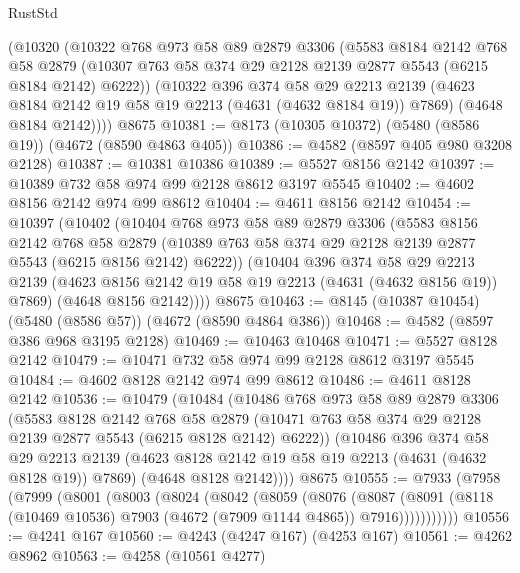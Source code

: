 \begin{lexlean}{RustStd}
\begin{coremodule}
{\begin{coremodule}
{{{{{{{{{{{{{{{{    (@10320
      (@10322
        @768
        @973
        @58
        @89
        @2879
        @3306
        (@5583
          @8184
          @2142
          @768
          @58
          @2879
          (@10307 @763 @58 @374 @29 @2128 @2139 @2877 @5543 (@6215 @8184 @2142) @6222))
        (@10322
          @396
          @374
          @58
          @29
          @2213
          @2139
          (@4623 @8184 @2142 @19 @58 @19 @2213 (@4631 (@4632 @8184 @19)) @7869)
          (@4648 @8184 @2142))))
    @8675
@10381 := @8173 (@10305 @10372) (@5480 (@8586 @19)) (@4672 (@8590 @4863 @405))
@10386 := @4582 (@8597 @405 @980 @3208 @2128)
@10387 := @10381 @10386
@10389 := @5527 @8156 @2142
@10397 := @10389 @732 @58 @974 @99 @2128 @8612 @3197 @5545
@10402 := @4602 @8156 @2142 @974 @99 @8612
@10404 := @4611 @8156 @2142
@10454 := @10397
    (@10402
      (@10404
        @768
        @973
        @58
        @89
        @2879
        @3306
        (@5583
          @8156
          @2142
          @768
          @58
          @2879
          (@10389 @763 @58 @374 @29 @2128 @2139 @2877 @5543 (@6215 @8156 @2142) @6222))
        (@10404
          @396
          @374
          @58
          @29
          @2213
          @2139
          (@4623 @8156 @2142 @19 @58 @19 @2213 (@4631 (@4632 @8156 @19)) @7869)
          (@4648 @8156 @2142))))
    @8675
@10463 := @8145 (@10387 @10454) (@5480 (@8586 @57)) (@4672 (@8590 @4864 @386))
@10468 := @4582 (@8597 @386 @968 @3195 @2128)
@10469 := @10463 @10468
@10471 := @5527 @8128 @2142
@10479 := @10471 @732 @58 @974 @99 @2128 @8612 @3197 @5545
@10484 := @4602 @8128 @2142 @974 @99 @8612
@10486 := @4611 @8128 @2142
@10536 := @10479
    (@10484
      (@10486
        @768
        @973
        @58
        @89
        @2879
        @3306
        (@5583
          @8128
          @2142
          @768
          @58
          @2879
          (@10471 @763 @58 @374 @29 @2128 @2139 @2877 @5543 (@6215 @8128 @2142) @6222))
        (@10486
          @396
          @374
          @58
          @29
          @2213
          @2139
          (@4623 @8128 @2142 @19 @58 @19 @2213 (@4631 (@4632 @8128 @19)) @7869)
          (@4648 @8128 @2142))))
    @8675
@10555 := @7933
    (@7958
      (@7999
        (@8001
          (@8003
            (@8024
              (@8042
                (@8059
                  (@8076
                    (@8087
                      (@8091
                        (@8118 (@10469 @10536) @7903 (@4672 (@7909 @1144 @4865)) @7916)))))))))))
@10556 := @4241 @167
@10560 := @4243 (@4247 @167) (@4253 @167)
@10561 := @4262 @8962
@10563 := @4258 (@10561 @4277)
}}}}}}}}}}}}}}}}
\end{coremodule}}
\end{coremodule}
\end{lexlean}
